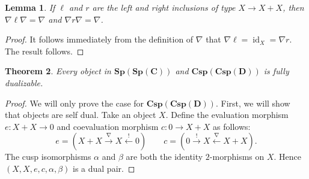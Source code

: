 \documentclass[11pt]{amsart}
\newcommand{\from}{\colon}
\newcommand{\xto}[1]{\xrightarrow{#1}}
\newcommand{\bispsp}[1]{\mathbf{Sp(Sp(#1))}}
\newcommand{\bicspcsp}[1]{\mathbf{Csp(Csp(#1))}}
\DeclareMathOperator{\id}{id}
\newtheorem{thm}{Theorem}[section]
\newtheorem{lem}[thm]{Lemma}
\theoremstyle{remark}
\theoremstyle{definition}
\begin{document}
\begin{lem}
	If $\ell$ and $r$ are the left and right inclusions of type $X \to X+X$, then $\nabla \ell \nabla = \nabla$ and $\nabla r \nabla = \nabla$.
\end{lem}

\begin{proof}
	It follows immediately from the definition of $\nabla$ that $\nabla \ell = \id_X = \nabla r$.  The result follows.  
\end{proof}

\begin{thm}
	\label{thm:SpansSpansAreFullyDualBicat}
	Every object in $\bispsp{C}$ and $\bicspcsp{D}$ is fully dualizable.
\end{thm}

\begin{proof}
	We will only prove the case for $\bicspcsp{D}$.  First, we will show that objects are self dual.  Take an object $X$. Define the evaluation morphism $e \from X+X \to 0$ and coevaluation morphism $c \from 0 \to X+X$ as follows:
	\[
		e = (X+X \xto{\nabla} X \xleftarrow{!} 0)
		\quad \quad
		c = (0 \xto{!} X \xleftarrow{\nabla} X+X ).
	\]
	The cusp isomorphisms $\alpha$ and $\beta$ are both the identity $2$-morphisms on $X$. Hence $(X,X,e,c,\alpha,\beta)$ is a dual pair.
	

\end{proof}
\end{document}
